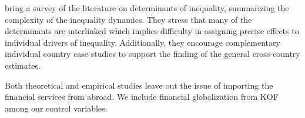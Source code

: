 \documentclass[a4paper,11pt]{article}
\begin{document}
\citet{nolan2019drivers} bring a survey of the literature on determinants of inequality, summarizing the complexity of the inequality dynamics. They stress that many of the determinants are interlinked which implies difficulty in assigning precise effects to individual drivers of inequality. Additionally, they encourage complementary individual country case studies to support the finding of the general cross-country estimates.

Both theoretical and empirical studies leave out the issue of importing the financial services from abroad. We include financial globalization from KOF among our control variables.






\end{document}
